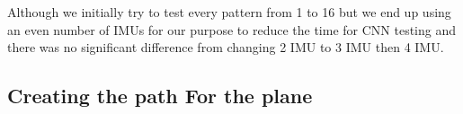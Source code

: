 Although we initially try to test every pattern from 1 to 16 but we end up using an even number of IMUs for our purpose to reduce the time for CNN testing and there was no significant difference from changing 2 IMU to 3 IMU then 4 IMU. 


\subsection{Creating the path For the plane}



